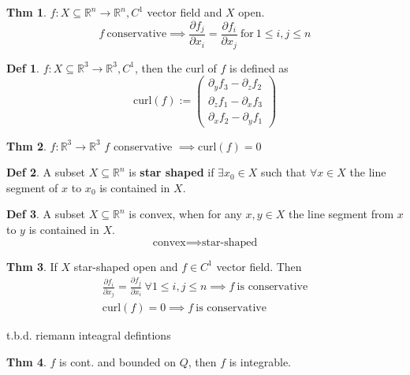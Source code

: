 \documentclass[a4paper, 10pt]{article}
\theoremstyle{definition}
\newtheorem*{theorem}{Thm}
\newtheorem*{definition}{Def}
\newcommand{\R}{\mathbb{R}}
\begin{document}
\begin{theorem}
    \(f: X \subseteq \R^n \to \R^n, C^1\) vector field and \(X\) open.
    \[f \ \text{conservative} \implies \frac{\partial f_j}{\partial x_i} = \frac{\partial f_i}{\partial x_j} \ \text{for} \ 1 \leq i, j \leq n\]
\end{theorem}

\begin{definition}
    \(f: X \subseteq \R^3 \to \R^3, C^1\), then the curl of \(f\) is defined as
    \[\text{curl}(f) := \begin{pmatrix}
        \partial_y f_3 - \partial_z f_2 \\
        \partial_z f_1 - \partial_x f_3 \\
        \partial_x f_2 - \partial_y f_1
    \end{pmatrix}\]
\end{definition}

\begin{theorem}
    \(f: \R^3 \to \R^3\) \(f\) conservative \(\implies \text{curl}(f) = 0\)
\end{theorem}

\begin{definition}
    A subset \(X \subseteq \R^n\) is \textbf{star shaped} if \(\exists x_0 \in X\) such that \(\forall x \in X\) the line segment of \(x\) to \(x_0\) is contained in \(X\).
\end{definition}

\begin{definition}
    A subset \(X \subseteq \R^n\) is convex, when for any \(x, y \in X\) the line segment from \(x\) to \(y\) is contained in \(X\).
    \[\text{convex} \implies \text{star-shaped}\]
\end{definition}

\begin{theorem}
    If \(X\) star-shaped open and \(f \in C^1\) vector field. Then
    \begin{gather*}
        \frac{\partial f_i}{\partial x_j} = \frac{\partial f_j}{\partial x_i} \ \forall 1 \leq i, j \leq n \implies f \ \text{is conservative} \\
        \text{curl}(f) = 0 \implies f \ \text{is conservative}
    \end{gather*}
\end{theorem}

t.b.d. riemann inteagral defintions

\begin{theorem}
    \(f\) is cont. and bounded on \(Q\), then \(f\) is integrable.
\end{theorem}
\end{document}
